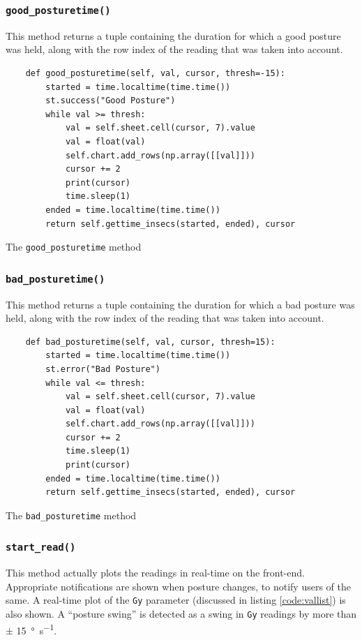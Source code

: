 \documentclass[a4paper,12pt]{report}
\newenvironment{code}{\captionsetup{type=listing}}{}
\begin{document}
\subsubsection{\texttt{good_posturetime()}}
This method returns a tuple containing the duration for which a good posture
was held, along with the row index of the reading that was taken into account.

\begin{code}
    \begin{verbatim}
    def good_posturetime(self, val, cursor, thresh=-15):
        started = time.localtime(time.time())
        st.success("Good Posture")
        while val >= thresh:
            val = self.sheet.cell(cursor, 7).value
            val = float(val)
            self.chart.add_rows(np.array([[val]]))
            cursor += 2
            print(cursor)
            time.sleep(1)
        ended = time.localtime(time.time())
        return self.gettime_insecs(started, ended), cursor
    \end{verbatim}
    \caption{The \texttt{good_posturetime} method}
    \label{code:good_posturetime}
\end{code}

\subsubsection{\texttt{bad_posturetime()}}
This method returns a tuple containing the duration for which a bad posture
was held, along with the row index of the reading that was taken into account.

\begin{code}
    \begin{verbatim}
    def bad_posturetime(self, val, cursor, thresh=15):
        started = time.localtime(time.time())
        st.error("Bad Posture")
        while val <= thresh:
            val = self.sheet.cell(cursor, 7).value
            val = float(val)
            self.chart.add_rows(np.array([[val]]))
            cursor += 2
            time.sleep(1)
            print(cursor)
        ended = time.localtime(time.time())
        return self.gettime_insecs(started, ended), cursor
    \end{verbatim}
    \caption{The \texttt{bad_posturetime} method}
    \label{code:bad_posturetime}
\end{code}

\subsubsection{\texttt{start_read()}}
This method actually plots the readings in real-time on the front-end.
Appropriate notifications are shown when posture changes, to notify users of
the same. A real-time plot of the \texttt{Gy} parameter (discussed in listing
\ref{code:vallist}) is also shown. A ``posture swing'' is detected as a swing in
\texttt{Gy} readings by more than $\pm$ \qty{15}{\degree\per\second}.
\end{document}
